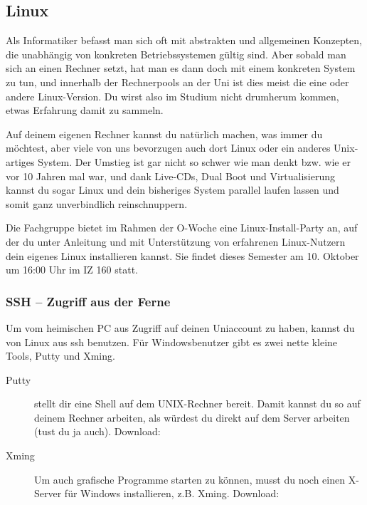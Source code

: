 

\subsection{Linux}
	\label{linux}
	Als Informatiker befasst man sich oft mit abstrakten und allgemeinen Konzepten, die unabhängig von konkreten Betriebssystemen gültig sind. Aber sobald man sich an einen Rechner setzt, hat man es dann doch mit einem konkreten System zu tun, und innerhalb der Rechnerpools an der Uni ist dies meist die eine oder andere Linux-Version. Du wirst also im Studium nicht drumherum kommen, etwas Erfahrung damit zu sammeln.

	Auf deinem eigenen Rechner kannst du natürlich machen, was immer du möchtest, aber viele von uns bevorzugen auch dort Linux oder ein anderes Unix-artiges System. Der Umstieg ist gar nicht so schwer wie man denkt bzw. wie er vor 10 Jahren mal war, und dank Live-CDs, Dual Boot und Virtualisierung kannst du sogar Linux und dein bisheriges System parallel laufen lassen und somit ganz unverbindlich reinschnuppern.

	Die Fachgruppe bietet im Rahmen der O-Woche eine Linux-Install-Party an, auf der du unter Anleitung und mit Unterstützung von erfahrenen Linux-Nutzern dein eigenes Linux installieren kannst. Sie findet dieses Semester am 10. Oktober um 16:00 Uhr im IZ 160 statt. 



	\subsubsection{SSH -- Zugriff aus der Ferne}
		Um vom heimischen PC aus Zugriff auf deinen Uniaccount zu haben, kannst du von Linux aus ssh benutzen. Für Windowsbenutzer gibt es zwei nette kleine Tools, Putty und Xming. %

		\begin{description}
			\item[Putty] stellt dir eine Shell auf dem UNIX-Rechner bereit. Damit kannst du so auf deinem Rechner arbeiten, als würdest du direkt auf dem Server arbeiten (tust du ja auch).  Download: 
			\item[Xming] Um auch grafische Programme starten zu können, musst du noch einen X-Server für Windows
			  installieren, z.B. Xming. Download: 
		\end{description}


